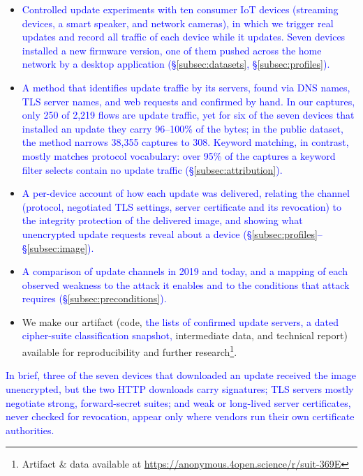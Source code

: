 \begin{itemize}
    \item[\textbullet]
    \textcolor{blue}{Controlled update experiments with ten consumer IoT devices (streaming devices, a smart speaker, and network cameras), in which we trigger real updates and record all traffic of each device while it updates. Seven devices installed a new firmware version, one of them pushed across the home network by a desktop application (\S\ref{subsec:datasets}, \S\ref{subsec:profiles}).}
    \item[\textbullet]
    \textcolor{blue}{A method that identifies update traffic by its servers, found via DNS names, TLS server names, and web requests and confirmed by hand. In our captures, only 250 of 2,219 flows are update traffic, yet for six of the seven devices that installed an update they carry 96--100\% of the bytes; in the public dataset, the method narrows 38,355 captures to 308. Keyword matching, in contrast, mostly matches protocol vocabulary: over 95\% of the captures a keyword filter selects contain no update traffic (\S\ref{subsec:attribution}).}
    \item[\textbullet]
    \textcolor{blue}{A per-device account of how each update was delivered, relating the channel (protocol, negotiated TLS settings, server certificate and its revocation) to the integrity protection of the delivered image, and showing what unencrypted update requests reveal about a device (\S\ref{subsec:profiles}--\S\ref{subsec:image}).}
    \item[\textbullet]
    \textcolor{blue}{A comparison of update channels in 2019 and today, and a mapping of each observed weakness to the attack it enables and to the conditions that attack requires (\S\ref{subsec:preconditions}).}
    \item[\textbullet]  We make our artifact (code, \textcolor{blue}{the lists of confirmed update servers, a dated cipher-suite classification snapshot,} intermediate data, and technical report) available for reproducibility and further research\footnote{Artifact \& data  available at \url{https://anonymous.4open.science/r/suit-369E}}.
\end{itemize}

\textcolor{blue}{In brief, three of the seven devices that downloaded an update received the image unencrypted, but the two HTTP downloads carry signatures; TLS servers mostly negotiate strong, forward-secret suites; and weak or long-lived server certificates, never checked for revocation, appear only where vendors run their own certificate authorities.}
